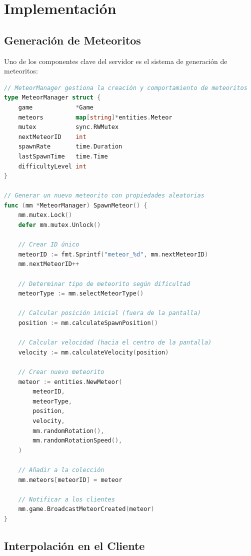 \documentclass[11pt,letterpaper]{article}
\begin{document}
\section{Implementación}

\subsection{Generación de Meteoritos}

Uno de los componentes clave del servidor es el sistema de generación de meteoritos:

\begin{lstlisting}[language=go, caption=Sistema de generación de meteoritos]
// MeteorManager gestiona la creación y comportamiento de meteoritos
type MeteorManager struct {
    game            *Game
    meteors         map[string]*entities.Meteor
    mutex           sync.RWMutex
    nextMeteorID    int
    spawnRate       time.Duration
    lastSpawnTime   time.Time
    difficultyLevel int
}

// Generar un nuevo meteorito con propiedades aleatorias
func (mm *MeteorManager) SpawnMeteor() {
    mm.mutex.Lock()
    defer mm.mutex.Unlock()
    
    // Crear ID único
    meteorID := fmt.Sprintf("meteor_%d", mm.nextMeteorID)
    mm.nextMeteorID++
    
    // Determinar tipo de meteorito según dificultad
    meteorType := mm.selectMeteorType()
    
    // Calcular posición inicial (fuera de la pantalla)
    position := mm.calculateSpawnPosition()
    
    // Calcular velocidad (hacia el centro de la pantalla)
    velocity := mm.calculateVelocity(position)
    
    // Crear nuevo meteorito
    meteor := entities.NewMeteor(
        meteorID,
        meteorType,
        position,
        velocity,
        mm.randomRotation(),
        mm.randomRotationSpeed(),
    )
    
    // Añadir a la colección
    mm.meteors[meteorID] = meteor
    
    // Notificar a los clientes
    mm.game.BroadcastMeteorCreated(meteor)
}
\end{lstlisting}

\subsection{Interpolación en el Cliente}
\end{document}
